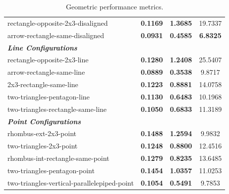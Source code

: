 \begin{table}[htbp]
{\begin{tabular}{lccc}
rectangle-opposite-2x3-disaligned & \textbf{0.1169} & \textbf{1.3685} & 19.7337 \\
arrow-rectangle-same-disaligned & \textbf{0.0931} & \textbf{0.4585} & \textbf{6.8325} \\
\midrule
\multicolumn{4}{l}{\textit{\textbf{Line Configurations}}} \\
\midrule
rectangle-opposite-2x3-line & \textbf{0.1280} & \textbf{1.2408} & 25.5407 \\
arrow-rectangle-same-line & \textbf{0.0889} & \textbf{0.3538} & 9.8717 \\
2x3-rectangle-same-line & \textbf{0.1223} & \textbf{0.8881} & 14.0758 \\
two-triangles-pentagon-line & \textbf{0.1130} & \textbf{0.6483} & 10.1968 \\
two-triangles-rectangle-same-line & \textbf{0.1050} & \textbf{0.6833} & 11.3189 \\
\midrule
\multicolumn{4}{l}{\textit{\textbf{Point Configurations}}} \\
\midrule
rhombus-ext-2x3-point & \textbf{0.1488} & \textbf{1.2594} & 9.9832 \\
two-triangles-2x3-point & \textbf{0.1248} & \textbf{0.8800} & 12.4516 \\
rhombus-int-rectangle-same-point & \textbf{0.1279} & \textbf{0.8235} & 13.6485 \\
two-triangles-pentagon-point & \textbf{0.1454} & \textbf{1.0357} & 11.0253 \\
two-triangles-vertical-parallelepiped-point & \textbf{0.1054} & \textbf{0.5491} & 9.7853 \\
\bottomrule
\end{tabular}}
\caption{Geometric performance metrics.}
\label{tab:dexterity_all_configurations}
\end{table}